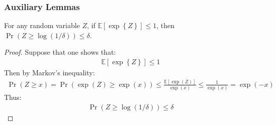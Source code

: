 \documentclass[12pt]{extarticle} %
\newcommand{\E}{\mathbb{E}}
\begin{document}



\subsubsection{Auxiliary Lemmas}
\begin{lemma}\label{lem:exp-tail}
For any random variable $Z$, if $\mathbb{E}\left[\exp\left\{ Z\right\} \right] \leq 1$, then $\Pr(Z \geq \log(1/\delta)) \leq \delta$.
\end{lemma}
\begin{proof}
Suppose that one shows that:
\begin{align}
    \mathbb{E}\left[\exp\left\{ Z\right\} \right] \leq 1
\end{align}
Then by Markov's inequality:
\begin{align}
    \Pr(Z \geq x) = \Pr(\exp(Z) \geq \exp(x)) \leq \frac{\mathbb{E}[\exp(Z)]}{\exp(x)}\leq \frac{1}{\exp(x)} = \exp(-x)
\end{align}
Thus:
\begin{align}
    \Pr(Z\geq \log(1/\delta)) \leq \delta
\end{align}
\end{proof}
\end{document}
